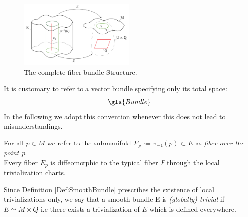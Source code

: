 \documentclass[Main]{subfiles}
\begin{document}
			\begin{figure}[h!]
  				\caption{The complete fiber bundle Structure.}
  				\includegraphics[width=0.5\textwidth]{Pictures/fiberbundle}				
  				\centering
			\end{figure}
				It is customary to refer to a vector bundle specifying only its total space:
				\begin{displaymath}
					\gls{Bundle}%
				\end{displaymath}
			 	In the following we adopt this convention whenever this does not lead to misunderstandings.
			
			\vspace{2mm}
				For all $p\in M$ we refer to the submanifold $E_{p} := \pi_{-1}(p) \subset E $ as \emph{fiber over the point p}.
				\\
				Every fiber $E_p$ is diffeomorphic to the typical fiber $F$ through the local trivialization charts.

			\vspace{2mm}
				Since  Definition \ref{Def:SmoothBundle}  prescribes the existence of local trivializations only,
				we say that a smooth bundle E is \emph{(globally) trivial} if $E \simeq M \times Q$ i.e there exists a trivialization of $E$ which is defined everywhere.
			\vspace{3mm}
			
\end{document}
